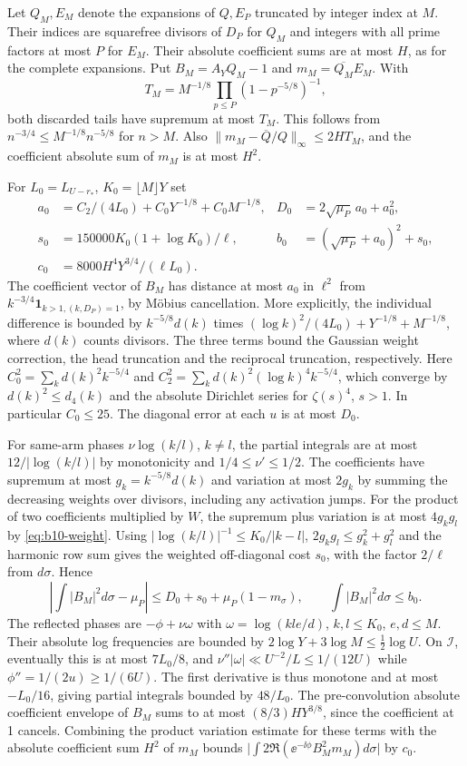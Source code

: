 Let \(Q_M,E_M\) denote the expansions of \(Q,E_P\) truncated
by integer index at \(M\). Their indices are squarefree divisors
of \(D_P\) for \(Q_M\) and integers with all prime factors at most
\(P\) for \(E_M\). Their absolute coefficient sums are at most
\(H\), as for the complete expansions. Put \(B_M=A_YQ_M-1\) and
\(m_M=\overline{Q_M}E_M\). With
\[
 T_M=M^{-1/8}\prod_{p\le P}(1-p^{-5/8})^{-1},
\]
both discarded tails have supremum at most \(T_M\). This follows
from \(n^{-3/4}\le M^{-1/8}n^{-5/8}\) for \(n>M\).
Also \(\|m_M-\overline Q/Q\|_\infty\le2HT_M\), and
the coefficient absolute sum of \(m_M\) is at most \(H^2\).

For \(L_0=L_{U-r_*}\), \(K_0=\lfloor M\rfloor Y\) set
\begin{align*}
 a_0&=C_2/(4L_0)+C_0Y^{-1/8}+C_0M^{-1/8},
 &D_0&=2\sqrt{\mu_P}\,a_0+a_0^2,\\
 s_0&=150000 K_0(1+\log K_0)/\ell,
 &b_0&=(\sqrt{\mu_P}+a_0)^2+s_0,\\
 c_0&=8000 H^4Y^{3/4}/(\ell L_0).
\end{align*}
The coefficient vector of \(B_M\) has distance at most \(a_0\)
in \(\ell^2\) from \(k^{-3/4}\mathbf1_{k>1,(k,D_P)=1}\),
by Möbius cancellation. More explicitly, the individual difference
is bounded by \(k^{-5/8}d(k)\) times
\((\log k)^2/(4L_0)+Y^{-1/8}+M^{-1/8}\), where \(d(k)\) counts
divisors. The three terms bound the Gaussian weight correction,
the head truncation and the reciprocal truncation, respectively.
Here \(C_0^2=\sum_k d(k)^2 k^{-5/4}\) and
\(C_2^2=\sum_k d(k)^2(\log k)^4k^{-5/4}\), which converge by
\(d(k)^2\le d_4(k)\) and the absolute Dirichlet series for
\(\zeta(s)^4\), \(s>1\). In particular \(C_0\le25\).
The diagonal error at each \(u\) is at most \(D_0\).

For same-arm phases \(\nu\log(k/l)\), \(k\ne l\), the partial
integrals are at most \(12/|\log(k/l)|\) by monotonicity
and \(1/4\le\nu'\le1/2\). The coefficients have supremum at most
\(g_k=k^{-5/8}d(k)\) and variation at most \(2g_k\) by summing
the decreasing weights over divisors, including any activation
jumps. For the product of two coefficients multiplied by \(W\),
the supremum plus variation is at most \(4g_kg_l\) by
\eqref{eq:b10-weight}. Using
\(|\log(k/l)|^{-1}\le K_0/|k-l|\), \(2g_kg_l\le g_k^2+g_l^2\)
and the harmonic row sum gives the weighted off-diagonal cost
\(s_0\), with the factor \(2/\ell\) from \(d\sigma\). Hence
\[
 \left|\int|B_M|^2d\sigma-\mu_P\right|
 \le D_0+s_0+\mu_P(1-m_\sigma),\qquad
 \int|B_M|^2d\sigma\le b_0.
\]
The reflected phases are \(-\phi+\nu\omega\) with
\(\omega=\log(kle/d)\), \(k,l\le K_0\), \(e,d\le M\).
Their absolute log frequencies are bounded by
\(2\log Y+3\log M\le\tfrac12\log U\).
On \(\mathcal I\), eventually this is at most \(7L_0/8\),
and \(\nu''|\omega|\ll U^{-2}/L\le1/(12U)\) while
\(\phi''=1/(2u)\ge1/(6U)\). The first derivative is thus
monotone and at most \(-L_0/16\), giving partial integrals
bounded by \(48/L_0\).
The pre-convolution absolute coefficient envelope of \(B_M\)
sums to at most \((8/3)HY^{3/8}\), since the coefficient at
1 cancels. Combining the product variation estimate for these
terms with the absolute coefficient sum \(H^2\) of \(m_M\)
bounds \(\big|\int 2\Re(\ee^{-\ii\phi}B_M^2m_M)d\sigma\big|\)
by \(c_0\).

